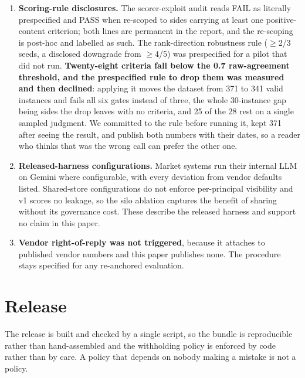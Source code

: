 \documentclass[11pt]{article}
\begin{document}
\begin{enumerate}[leftmargin=*, itemsep=.3em]
\item \textbf{Scoring-rule disclosures.} The scorer-exploit audit reads FAIL as
literally prespecified and PASS when re-scoped to sides carrying at least one
positive-content criterion; both lines are permanent in the report, and the
re-scoping is post-hoc and labelled as such. The rank-direction robustness rule ($\geq$2/3 seeds, a disclosed downgrade from
$\geq$4/5) was prespecified for a pilot that did not run. \textbf{Twenty-eight
criteria fall below the 0.7 raw-agreement threshold, and the prespecified rule
to drop them was measured and then declined}: applying it moves the dataset from
371 to 341 valid instances and fails all six gates instead of three, the whole
30-instance gap being sides the drop leaves with no criteria, and 25 of the 28
rest on a single sampled judgment. We committed to the rule before running it,
kept 371 after seeing the result, and publish both numbers with their dates, so
a reader who thinks that was the wrong call can prefer the other one.

\item \textbf{Released-harness configurations.} Market systems run their internal LLM on Gemini where configurable, with every
deviation from vendor defaults listed. Shared-store configurations do not
enforce per-principal visibility and v1 scores no leakage, so the silo ablation
captures the benefit of sharing without its governance cost. These describe the
released harness and support no claim in this paper.

\item \textbf{Vendor right-of-reply was not triggered}, because it attaches to
published vendor numbers and this paper publishes none. The procedure stays
specified for any re-anchored evaluation.
\end{enumerate}

\section{Release}

The release is built and checked by a single script, so the bundle is reproducible
rather than hand-assembled and the withholding policy is enforced by code rather
than by care. A policy that depends on nobody making a mistake is not a policy.
\end{document}
